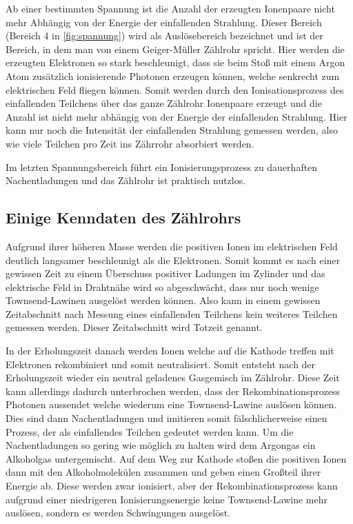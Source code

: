 Ab einer bestimmten Spannung ist die Anzahl der erzeugten Ionenpaare nicht mehr Abhängig von der Energie der einfallenden Strahlung.
Dieser Bereich (Bereich 4 in \autoref{fig:spannung}) wird als Auslösebereich bezeichnet und ist der Bereich, in dem man von einem Geiger-Müller Zählrohr spricht.
Hier werden die erzeugten Elektronen so stark beschleunigt, dass sie beim Stoß mit einem Argon Atom zusätzlich ionisierende Photonen erzeugen können, welche senkrecht zum elektrischen Feld fliegen können.
Somit werden durch den Ionisationsprozess des einfallenden Teilchens über das ganze Zählrohr Ionenpaare erzeugt und die Anzahl ist nicht mehr abhängig von der Energie der einfallenden Strahlung.
Hier kann nur noch die Intensität der einfallenden Strahlung gemessen werden, also wie viele Teilchen pro Zeit ins Zährrohr absorbiert werden.

Im letzten Spannungsbereich führt ein Ionisierungsprozess zu dauerhaften Nachentladungen und das Zählrohr ist praktisch nutzlos.

\subsection{Einige Kenndaten des Zählrohrs}
\label{ssec:totzeit}

Aufgrund ihrer höheren Masse werden die positiven Ionen im elektrischen Feld deutlich langsamer beschleunigt als die Elektronen.
Somit kommt es nach einer gewissen Zeit zu einem Überschuss positiver Ladungen im Zylinder und das elektrische Feld in Drahtnähe wird so abgeschwächt, dass nur noch wenige Townsend-Lawinen ausgelöst werden können.
Also kann in einem gewissen Zeitabschnitt nach Messung eines einfallenden Teilchens kein weiteres Teilchen gemessen werden.
Dieser Zeitabschnitt wird Totzeit genannt.

In der Erholungszeit danach werden Ionen welche auf die Kathode treffen mit Elektronen rekombiniert und somit neutralisiert.
Somit entsteht nach der Erholungszeit wieder ein neutral geladenes Gasgemisch im Zählrohr.
Diese Zeit kann allerdings dadurch unterbrochen werden, dass der Rekombinationsprozess Photonen aussendet welche wiederum eine Townsend-Lawine auslösen können.
Dies sind dann Nachentladungen und imitieren somit fälschlicherweise einen Prozess, der als einfallendes Teilchen gedeutet werden kann.
Um die Nachentladungen so gering wie möglich zu halten wird dem Argongas ein Alkoholgas untergemischt.
Auf dem Weg zur Kathode stoßen die positiven Ionen dann mit den Alkoholmolekülen zusammen und geben einen Großteil ihrer Energie ab.
Diese werden zwar ionisiert, aber der Rekombinationsprozess kann aufgrund einer niedrigeren Ionisierungsenergie keine Townsend-Lawine mehr auslösen, sondern es werden Schwingungen ausgelöst.

